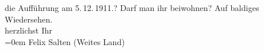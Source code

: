 \begin{ledgroupsized}[t]{13cm}
{{{                  die Aufführung am 5. 12. 1911.}}}\label{K_L02949-3h}? Darf man ihr beiwohnen?\pend
           \pstart
           Auf baldiges Wiedersehen. {\\[\baselineskip]}herzlichst Ihr {\\[\baselineskip]}\pend
           \leftskip=0em{}{\bigskip}\pstart
           \noindent{}Felix Salten\pend
           \pstart
           (Weites Land)\pend
           
         
         \endnumbering{}\end{ledgroupsized}  \newcommand{\dateiname}{L02949}\newcommand{\titel}{Arthur Schnitzler an Felix Salten, 20. 10. 1911}\newcommand{\editorInnen}{Martin Anton Müller und Laura Untner}
      